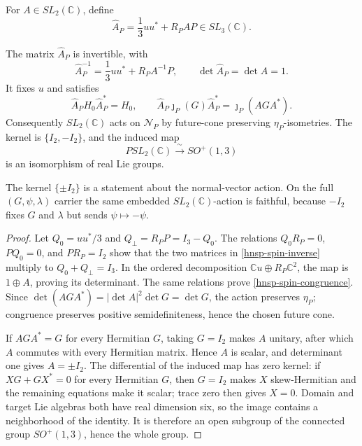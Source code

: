 For \(A\in SL_2(\mathbb C)\), define
\begin{equation}
 \widehat A_P=\frac13uu^*+R_P A P\in SL_3(\mathbb C).
 \label{hnsp-lifted-spin-action}
\end{equation}

\begin{theorem}
\label{hnsp-spin-theorem}
The matrix \(\widehat A_P\) is invertible, with
\begin{equation}
 \widehat A_P^{-1}=\frac13uu^*+R_P A^{-1}P,
 \qquad \det\widehat A_P=\det A=1.
 \label{hnsp-spin-inverse}
\end{equation}
It fixes \(u\) and satisfies
\begin{equation}
 \widehat A_P H_0\widehat A_P^*=H_0,
 \qquad
 \widehat A_P\jmath_P(G)\widehat A_P^*
 =\jmath_P(AGA^*).
 \label{hnsp-spin-congruence}
\end{equation}
Consequently \(SL_2(\mathbb C)\) acts on \(\mathcal N_P\) by future-cone
preserving \(\eta_P\)-isometries.  The kernel is \(\{I_2,-I_2\}\), and the
induced map
\begin{equation}
 PSL_2(\mathbb C)\xrightarrow{\ \sim\ }SO^+(1,3)
 \label{hnsp-spin-cover}
\end{equation}
is an isomorphism of real Lie groups.
\end{theorem}

The kernel \(\{\pm I_2\}\) is a statement about the normal-vector action.
On the full \((G,\psi,\lambda)\) carrier the same embedded
\(SL_2(\mathbb C)\)-action is faithful, because \(-I_2\) fixes \(G\) and
\(\lambda\) but sends \(\psi\mapsto-\psi\).

\begin{proof}
Let \(Q_0=uu^*/3\) and \(Q_\perp=R_P P=I_3-Q_0\).  The relations
\(Q_0R_P=0\), \(PQ_0=0\), and \(PR_P=I_2\) show that the two matrices in
\eqref{hnsp-spin-inverse} multiply to \(Q_0+Q_\perp=I_3\).  In the ordered
decomposition \(\mathbb Cu\oplus R_P\mathbb C^2\), the map is
\(1\oplus A\), proving its determinant.  The same relations prove
\eqref{hnsp-spin-congruence}.  Since
\(\det(AGA^*)=|\det A|^2\det G=\det G\), the action preserves
\(\eta_P\); congruence preserves positive semidefiniteness, hence the chosen
future cone.

If \(AGA^*=G\) for every Hermitian \(G\), taking \(G=I_2\) makes \(A\)
unitary, after which \(A\) commutes with every Hermitian matrix.  Hence
\(A\) is scalar, and determinant one gives \(A=\pm I_2\).  The differential
of the induced map has zero kernel: if
\(XG+GX^*=0\) for every Hermitian \(G\), then \(G=I_2\) makes \(X\)
skew-Hermitian and the remaining equations make it scalar; trace zero then
gives \(X=0\).  Domain and target Lie algebras both have real dimension six,
so the image contains a neighborhood of the identity.  It is therefore an
open subgroup of the connected group \(SO^+(1,3)\), hence the whole group.
\end{proof}

